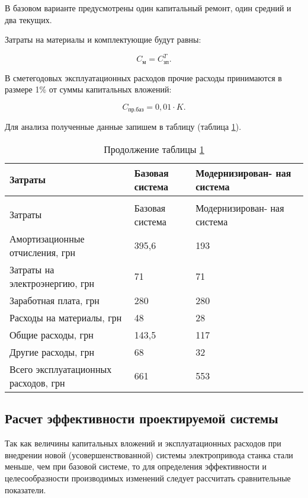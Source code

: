         В базовом варианте предусмотрены один капитальный ремонт, один средний
        и два текущих.

        Затраты на материалы и комплектующие будут равны:

        \begin{equation}
            C_\text{м} = C_\text{зп}^T. 
        \end{equation}

        В сметегодовых эксплуатационных расходов прочие расходы принимаются в
        размере 1\% от суммы капитальных вложений:

        \begin{equation}
            C_\text{пр.баз} = 0,01 \cdot K.
        \end{equation}

        Для анализа полученные данные запишем в таблицу (таблица
        \ref{table:usage-cost}).

        \begin{longtable}{|p{8cm}|p{3cm}|p{4cm}|}
            \caption{Эксплуатационные затраты
                \label{table:usage-cost}}\\
            \hline
            Затраты & Базовая система & Модернизирован- ная система\\
            \hline
            \endfirsthead
            \caption*{Продолжение таблицы \ref{table:usage-cost}}\\
            \hline
            Затраты & Базовая система & Модернизирован- ная система\\
            \endhead
            \hline
            Амортизационные отчисления, грн & 395,6 & 193\\
            \hline
            Затраты на электроэнергию, грн & 71 & 71\\
            \hline
            Заработная плата, грн & 280 & 280\\
            \hline
            Расходы на материалы, грн & 48 & 28\\
            \hline
            Общие расходы, грн & 143,5 & 117\\
            \hline
            Другие расходы, грн & 68 & 32\\
            \hline
            Всего эксплуатационных расходов, грн & 661 & 553\\
            \hline
        \end{longtable}
    
    \subsection{Расчет эффективности проектируемой системы}
        Так как величины капитальных вложений и эксплуатационных расходов при
        внедрении новой (усовершенствованной) системы электропривода станка
        стали меньше, чем при базовой системе, то для определения эффективности
        и целесообразности производимых изменений следует рассчитать
        сравнительные показатели.  
        
